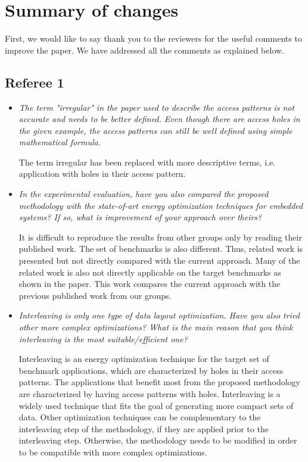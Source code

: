\documentclass[12pt,a4paper,notitlepage]{article}
\author{Iason}
\begin{document}
\section*{Summary of changes}

First, we would like to say thank you to the reviewers for the useful comments to improve the paper. We have addressed all the comments as explained below.

\subsection*{Referee 1}

\begin{itemize}

\item \textit{The term "irregular" in the paper used to describe the access patterns is not accurate and needs to be better defined. Even though there are access holes in the given example, the access patterns can still be well defined using simple mathematical formula.}

The term irregular has been replaced with more descriptive terms, i.e. application with holes in their access pattern.

\item \textit{In the experimental evaluation, have you also compared the proposed methodology with the state-of-art energy optimization techniques for embedded systems? If so, what is improvement of your approach over theirs?}

It is difficult to reproduce the results from other groups only by reading their published work. The set of benchmarks is also different. Thus, related work is presented but not directly compared with the current approach. Many of the related work is also not directly applicable on the target benchmarks as shown in the paper. This work compares the current approach with the previous published work from our groups.

\item \textit{Interleaving is only one type of data layout optimization. Have you also tried other more complex optimizations? What is the main reason that you think interleaving is the most suitable/efficient one?}

Interleaving is an energy optimization technique for the target set of benchmark applications, which are characterized by holes in their access patterns.
The applications that benefit most from the proposed methodology are characterized by having access patterns with holes.
Interleaving is a widely used technique that fits the goal of generating more compact sets of data.
Other optimization techniques can be complementary to the interleaving step of the methodology, if they are applied prior to the interleaving step.
Otherwise, the methodology needs to be modified in order to be compatible with more complex optimizations.


\end{itemize}
\end{document}
